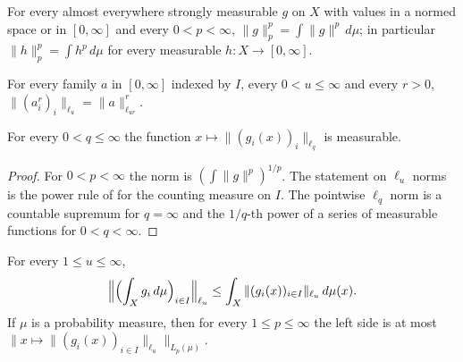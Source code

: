 \begin{lemma}
\label{lem:lp-norm-nonnegative}
\leanok
{}
For every almost everywhere strongly measurable $g$ on $X$ with values in a normed space or in
$[0, \infty]$ and every $0 < p < \infty$, $\|g\|_p^p = \int \|g\|^p \, d\mu$; in particular
$\|h\|_p^p = \int h^p \, d\mu$ for every measurable $h : X \to [0, \infty]$.

For every family $a$ in $[0, \infty]$ indexed by $I$, every $0 < u \leq \infty$ and every
$r > 0$, $\|(a_i^r)_i\|_{\ell_u} = \|a\|_{\ell_{ur}}^r$.

For every $0 < q \leq \infty$ the function $x \mapsto \|(g_i(x))_i\|_{\ell_q}$ is measurable.
\end{lemma}

\begin{proof}
\leanok
{}
For $0 < p < \infty$ the norm is $(\int \|g\|^p)^{1/p}$. The statement on $\ell_u$ norms is the
power rule of  for the counting measure on $I$. The pointwise
$\ell_q$ norm is a countable supremum for $q = \infty$ and the $1/q$-th power of a series of
measurable functions for $0 < q < \infty$.
\end{proof}

\begin{lemma}
\label{lem:minkowski-integral-lq}
\leanok
{}
For every $1 \leq u \leq \infty$,
\[
  \Bigl\| \Bigl( \int_X g_i \, d\mu \Bigr)_{i \in I} \Bigr\|_{\ell_u}
  \leq \int_X \|(g_i(x))_{i \in I}\|_{\ell_u} \, d\mu(x) .
\]
If $\mu$ is a probability measure, then for every $1 \leq p \leq \infty$ the left side is at most
$\bigl\| x \mapsto \|(g_i(x))_{i \in I}\|_{\ell_u} \bigr\|_{L_p(\mu)}$.
\end{lemma}


